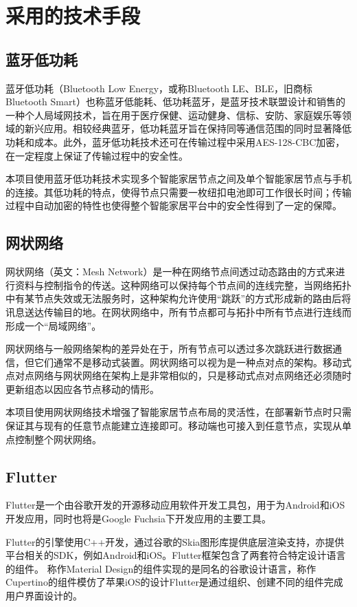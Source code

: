 \chapter{采用的技术手段}

\section{蓝牙低功耗}
蓝牙低功耗（Bluetooth Low Energy，或称Bluetooth LE、BLE，旧商标Bluetooth Smart）也称蓝牙低能耗、低功耗蓝牙，是蓝牙技术联盟设计和销售的一种个人局域网技术，旨在用于医疗保健、运动健身、信标、安防、家庭娱乐等领域的新兴应用。相较经典蓝牙，低功耗蓝牙旨在保持同等通信范围的同时显著降低功耗和成本。\cite{ble}此外，蓝牙低功耗技术还可在传输过程中采用AES-128-CBC加密，在一定程度上保证了传输过程中的安全性。

本项目使用蓝牙低功耗技术实现多个智能家居节点之间及单个智能家居节点与手机的连接。其低功耗的特点，使得节点只需要一枚纽扣电池即可工作很长时间；传输过程中自动加密的特性也使得整个智能家居平台中的安全性得到了一定的保障。

\section{网状网络}
网状网络（英文：Mesh Network）是一种在网络节点间透过动态路由的方式来进行资料与控制指令的传送。这种网络可以保持每个节点间的连线完整，当网络拓扑中有某节点失效或无法服务时，这种架构允许使用“跳跃”的方式形成新的路由后将讯息送达传输目的地。在网状网络中，所有节点都可与拓扑中所有节点进行连线而形成一个“局域网络”。

网状网络与一般网络架构的差异处在于，所有节点可以透过多次跳跃进行数据通信，但它们通常不是移动式装置。网状网络可以视为是一种点对点的架构。移动式点对点网络与网状网络在架构上是非常相似的，只是移动式点对点网络还必须随时更新组态以因应各节点移动的情形。\cite{mesh}

本项目使用网状网络技术增强了智能家居节点布局的灵活性，在部署新节点时只需保证其与现有的任意节点能建立连接即可。移动端也可接入到任意节点，实现从单点控制整个网状网络。

\section{Flutter}
Flutter是一个由谷歌开发的开源移动应用软件开发工具包，用于为Android和iOS开发应用，同时也将是Google Fuchsia下开发应用的主要工具。\cite{flutter}

Flutter的引擎使用C++开发，通过谷歌的Skia图形库提供底层渲染支持，亦提供平台相关的SDK，例如Android和iOS。Flutter框架包含了两套符合特定设计语言的组件。 称作Material Design的组件实现的是同名的谷歌设计语言，称作Cupertino的组件模仿了苹果iOS的设计Flutter是通过组织、创建不同的组件完成用户界面设计的。 

